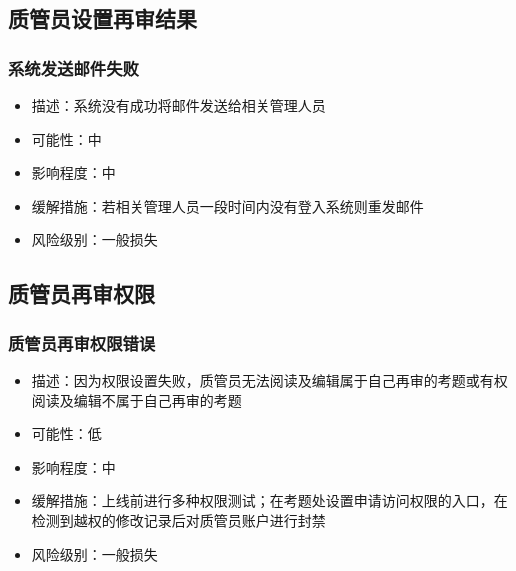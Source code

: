 \documentclass[hyperref, a4paper]{ctexart}
\providecommand{\tightlist}{%
  \setlength{\itemsep}{0pt}\setlength{\parskip}{0pt}}
\begin{document}
\hypertarget{ux8d28ux7ba1ux5458ux8bbeux7f6eux518dux5ba1ux7ed3ux679c}{%
\subsection{质管员设置再审结果}\label{ux8d28ux7ba1ux5458ux8bbeux7f6eux518dux5ba1ux7ed3ux679c}}

\hypertarget{ux7cfbux7edfux53d1ux9001ux90aeux4ef6ux5931ux8d25-3}{%
\subsubsection{系统发送邮件失败}\label{ux7cfbux7edfux53d1ux9001ux90aeux4ef6ux5931ux8d25-3}}

\begin{itemize}
\tightlist
\item
  描述：系统没有成功将邮件发送给相关管理人员
\item
  可能性：中
\item
  影响程度：中
\item
  缓解措施：若相关管理人员一段时间内没有登入系统则重发邮件
\item
  风险级别：一般损失
\end{itemize}

\hypertarget{ux8d28ux7ba1ux5458ux518dux5ba1ux6743ux9650-1}{%
\subsection{质管员再审权限}\label{ux8d28ux7ba1ux5458ux518dux5ba1ux6743ux9650-1}}

\hypertarget{ux8d28ux7ba1ux5458ux518dux5ba1ux6743ux9650ux9519ux8bef}{%
\subsubsection{质管员再审权限错误}\label{ux8d28ux7ba1ux5458ux518dux5ba1ux6743ux9650ux9519ux8bef}}

\begin{itemize}
\tightlist
\item
  描述：因为权限设置失败，质管员无法阅读及编辑属于自己再审的考题或有权阅读及编辑不属于自己再审的考题
\item
  可能性：低
\item
  影响程度：中
\item
  缓解措施：上线前进行多种权限测试；在考题处设置申请访问权限的入口，在检测到越权的修改记录后对质管员账户进行封禁
\item
  风险级别：一般损失
\end{itemize}
\end{document}
